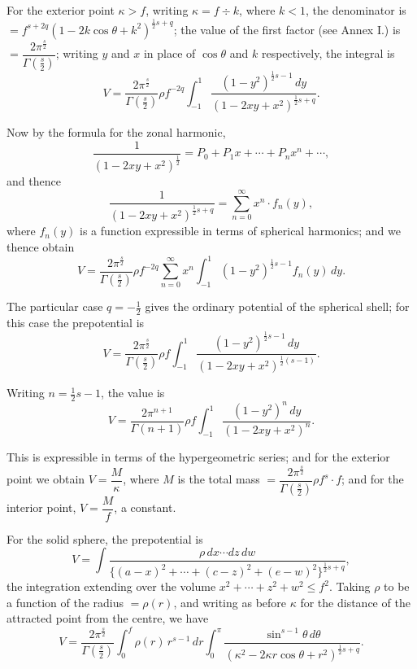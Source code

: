 \documentclass[11pt,a4paper]{book}
\begin{document}
\begin{art}\label{art:62}
For the exterior point $\kappa > f$, writing $\kappa = f \div k$, where $k < 1$, the denominator is $= f^{s+2q}(1 - 2k\cos\theta + k^2)^{\frac{1}{2}s+q}$; the value of the first factor (see Annex I.) is $= \dfrac{2\pi^{\frac{s}{2}}}{\Gamma(\frac{s}{2})}$; writing $y$ and $x$ in place of $\cos\theta$ and $k$ respectively, the integral is
\[
V = \frac{2\pi^{\frac{s}{2}}}{\Gamma(\frac{s}{2})} \rho f^{-2q} \int_{-1}^1 \frac{(1-y^2)^{\frac{1}{2}s-1} \, dy}{(1-2xy+x^2)^{\frac{1}{2}s+q}}.
\]

Now by the formula for the zonal harmonic,
\[
\frac{1}{(1-2xy+x^2)^{\frac{1}{2}}} = P_0 + P_1 x + \cdots + P_n x^n + \cdots,
\]
and thence
\[
\frac{1}{(1-2xy+x^2)^{\frac{1}{2}s+q}} = \sum_{n=0}^\infty x^n \cdot f_n(y),
\]
where $f_n(y)$ is a function expressible in terms of spherical harmonics; and we thence obtain
\[
V = \frac{2\pi^{\frac{s}{2}}}{\Gamma(\frac{s}{2})} \rho f^{-2q} \sum_{n=0}^\infty x^n \int_{-1}^1 (1-y^2)^{\frac{1}{2}s-1} f_n(y) \, dy.
\]
\end{art}

\begin{art}\label{art:63}
The particular case $q = -\tfrac{1}{2}$ gives the ordinary potential of the spherical shell; for this case the prepotential is
\[
V = \frac{2\pi^{\frac{s}{2}}}{\Gamma(\frac{s}{2})} \rho f \int_{-1}^1 \frac{(1-y^2)^{\frac{1}{2}s-1} \, dy}{(1-2xy+x^2)^{\frac{1}{2}(s-1)}}.
\]

Writing $n = \frac{1}{2}s-1$, the value is
\[
V = \frac{2\pi^{n+1}}{\Gamma(n+1)} \rho f \int_{-1}^1 \frac{(1-y^2)^n \, dy}{(1-2xy+x^2)^n}.
\]

This is expressible in terms of the hypergeometric series; and for the exterior point we obtain $V = \dfrac{M}{\kappa}$, where $M$ is the total mass $= \dfrac{2\pi^{\frac{s}{2}}}{\Gamma(\frac{s}{2})} \rho f^s \cdot f$; and for the interior point, $V = \dfrac{M}{f}$, a constant.
\end{art}

\begin{art}\label{art:64}
For the solid sphere, the prepotential is
\[
V = \int \frac{\rho \, dx \cdots dz \, dw}{\{(a-x)^2 + \cdots + (c-z)^2 + (e-w)^2\}^{\frac{1}{2}s+q}},
\]
the integration extending over the volume $x^2 + \cdots + z^2 + w^2 \leq f^2$. Taking $\rho$ to be a function of the radius $= \rho(r)$, and writing as before $\kappa$ for the distance of the attracted point from the centre, we have
\[
V = \frac{2\pi^{\frac{s}{2}}}{\Gamma(\frac{s}{2})} \int_0^f \rho(r) \, r^{s-1} \, dr \int_0^\pi \frac{\sin^{s-1}\theta \, d\theta}{(\kappa^2 - 2\kappa r\cos\theta + r^2)^{\frac{1}{2}s+q}}.
\]
\end{art}
\end{document}
